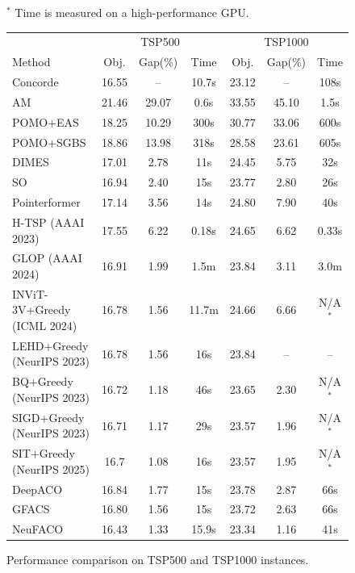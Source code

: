 \documentclass[a4paper,conference]{IEEEtran}
\begin{document}
\begin{figure}[!tb]
\centering
\footnotesize
\setlength{\tabcolsep}{2pt}
\renewcommand{\arraystretch}{1.2}

\footnotesize $^{*}$ Time is measured on a high-performance GPU. \\[3pt]
\begin{minipage}[t]{0.5\textwidth}
\vspace*{0pt}
\centering
\begin{tabular}{l ccc ccc}
\toprule[1pt]
& \multicolumn{3}{c}{TSP500} & \multicolumn{3}{c}{TSP1000}\\
\cmidrule(lr){2-4}\cmidrule(lr){5-7}
Method & Obj. & Gap(\%) & Time & Obj. & Gap(\%) & Time \\
\midrule[1pt]
Concorde           & 16.55 & --    & 10.7s & 23.12 & --   & 108s \\
\cmidrule(lr){1-1}\cmidrule(lr){2-4}\cmidrule(lr){5-7}
AM                 & 21.46 & 29.07 & 0.6s & 33.55 & 45.10 & 1.5s \\
POMO+EAS           & 18.25 & 10.29 & 300s & 30.77 & 33.06 & 600s \\
POMO+SGBS          & 18.86 & 13.98 & 318s & 28.58 & 23.61 & 605s \\
DIMES              & 17.01 & 2.78  & 11s  & 24.45 & 5.75  & 32s \\
SO                 & 16.94 & 2.40  & 15s  & 23.77 & 2.80  & 26s \\
Pointerformer      & 17.14 & 3.56  & 14s  & 24.80 & 7.90  & 40s \\
\cmidrule(lr){1-1}\cmidrule(lr){2-4}\cmidrule(lr){5-7}
H-TSP (AAAI 2023)             & 17.55 & 6.22  & 0.18s  & 24.65 & 6.62  & 0.33s\\
GLOP  (AAAI 2024)             & 16.91 & 1.99 & 1.5m  & 23.84 & 3.11  & 3.0m\\
INViT-3V+Greedy (ICML 2024)    & 16.78 & 1.56 & 11.7m & 24.66 & 6.66  & N/A$^{*}$ \\
LEHD+Greedy (NeurIPS 2023)             & 16.78 & 1.56 &16s & 23.84 & -- & -- \\
BQ+Greedy (NeurIPS 2023)             & 16.72 & 1.18 & 46s & 23.65 & 2.30  & N/A$^{*}$\\
SIGD+Greedy (NeurIPS 2023)             & 16.71 & 1.17 & 29s & 23.57 & 1.96  & N/A$^{*}$\\
SIT+Greedy (NeurIPS 2025)                   & 16.7 & 1.08 & 16s & 23.57 & 1.95 & N/A$^{*}$ \\
\cmidrule(lr){1-1}\cmidrule(lr){2-4}\cmidrule(lr){5-7}
DeepACO            & 16.84 & 1.77 & 15s & 23.78 & 2.87 & 66s \\
GFACS              & 16.80 & 1.56 & 15s & 23.72 & 2.63 & 66s \\
\cmidrule(lr){1-1}\cmidrule(lr){2-4}\cmidrule(lr){5-7}
NeuFACO            & 16.43 & 1.33 & 15.9s & 23.34 & 1.16 & 41s \\

\bottomrule[1pt]
\end{tabular}
\end{minipage}

\caption{Performance comparison on TSP500 and TSP1000 instances.}
\label{fig:tsp-results}
\end{figure}
\end{document}
